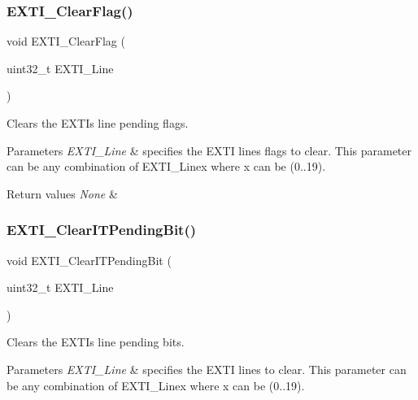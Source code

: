 \subsubsection{\texorpdfstring{EXTI\_ClearFlag()}{EXTI\_ClearFlag()}}
{\footnotesize\ttfamily void E\+X\+T\+I\+\_\+\+Clear\+Flag (\begin{DoxyParamCaption}\item[{uint32\+\_\+t}]{E\+X\+T\+I\+\_\+\+Line }\end{DoxyParamCaption})}



Clears the E\+X\+TI\textquotesingle{}s line pending flags. 


\begin{DoxyParams}{Parameters}
{\em E\+X\+T\+I\+\_\+\+Line} & specifies the E\+X\+TI lines flags to clear. This parameter can be any combination of E\+X\+T\+I\+\_\+\+Linex where x can be (0..19). \\
\hline
\end{DoxyParams}

\begin{DoxyRetVals}{Return values}
{\em None} & \\
\hline
\end{DoxyRetVals}
\mbox{\label{group___e_x_t_i___exported___functions_ga3652a7e682728b310c124e7e974d1468}} 
\subsubsection{\texorpdfstring{EXTI\_ClearITPendingBit()}{EXTI\_ClearITPendingBit()}}
{\footnotesize\ttfamily void E\+X\+T\+I\+\_\+\+Clear\+I\+T\+Pending\+Bit (\begin{DoxyParamCaption}\item[{uint32\+\_\+t}]{E\+X\+T\+I\+\_\+\+Line }\end{DoxyParamCaption})}



Clears the E\+X\+TI\textquotesingle{}s line pending bits. 


\begin{DoxyParams}{Parameters}
{\em E\+X\+T\+I\+\_\+\+Line} & specifies the E\+X\+TI lines to clear. This parameter can be any combination of E\+X\+T\+I\+\_\+\+Linex where x can be (0..19). \\
\hline
\end{DoxyParams}


